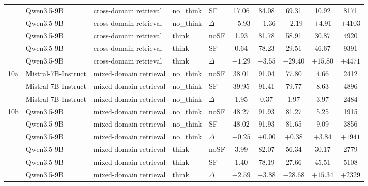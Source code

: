 \begin{scriptsize}
\begin{longtable}{l l l l l c c c c c}
 & Qwen3.5-9B & cross-domain retrieval & no\_think & SF & 17.06 & 84.08 & 69.31 & 10.92 & 8171 \\
 & Qwen3.5-9B & cross-domain retrieval & no\_think & $\Delta$ & $-5.93$ & $-1.36$ & $-2.19$ & $+4.91$ & $+4103$ \\
 & Qwen3.5-9B & cross-domain retrieval & think & noSF & 1.93 & 81.78 & 58.91 & 30.87 & 4920 \\
 & Qwen3.5-9B & cross-domain retrieval & think & SF & 0.64 & 78.23 & 29.51 & 46.67 & 9391 \\
 & Qwen3.5-9B & cross-domain retrieval & think & $\Delta$ & $-1.29$ & $-3.55$ & $-29.40$ & $+15.80$ & $+4471$ \\
\dmidrule
10a & Mistral-7B-Instruct & mixed-domain retrieval & no\_think & noSF & 38.01 & 91.04 & 77.80 & 4.66 & 2412 \\
 & Mistral-7B-Instruct & mixed-domain retrieval & no\_think & SF & 39.95 & 91.41 & 79.77 & 8.63 & 4896 \\
 & Mistral-7B-Instruct & mixed-domain retrieval & no\_think & $\Delta$ & 1.95 & 0.37 & 1.97 & 3.97 & 2484 \\
10b & Qwen3.5-9B & mixed-domain retrieval & no\_think & noSF & 48.27 & 91.93 & 81.27 & 5.25 & 1915 \\
 & Qwen3.5-9B & mixed-domain retrieval & no\_think & SF & 48.02 & 91.93 & 81.65 & 9.09 & 3856 \\
 & Qwen3.5-9B & mixed-domain retrieval & no\_think & $\Delta$ & $-0.25$ & $+0.00$ & $+0.38$ & $+3.84$ & $+1941$ \\
 & Qwen3.5-9B & mixed-domain retrieval & think & noSF & 3.99 & 82.07 & 56.34 & 30.17 & 2779 \\
 & Qwen3.5-9B & mixed-domain retrieval & think & SF & 1.40 & 78.19 & 27.66 & 45.51 & 5108 \\
 & Qwen3.5-9B & mixed-domain retrieval & think & $\Delta$ & $-2.59$ & $-3.88$ & $-28.68$ & $+15.34$ & $+2329$ \\
\end{longtable}
\end{scriptsize}

